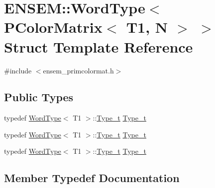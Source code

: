 \hypertarget{structENSEM_1_1WordType_3_01PColorMatrix_3_01T1_00_01N_01_4_01_4}{}\section{E\+N\+S\+EM\+:\+:Word\+Type$<$ P\+Color\+Matrix$<$ T1, N $>$ $>$ Struct Template Reference}
\label{structENSEM_1_1WordType_3_01PColorMatrix_3_01T1_00_01N_01_4_01_4}


{\ttfamily \#include $<$ensem\+\_\+primcolormat.\+h$>$}

\subsection*{Public Types}
\begin{DoxyCompactItemize}
\item 
typedef \mbox{\hyperlink{structENSEM_1_1WordType}{Word\+Type}}$<$ T1 $>$\+::\mbox{\hyperlink{structENSEM_1_1WordType_3_01PColorMatrix_3_01T1_00_01N_01_4_01_4_a32aa3b6b38804a81d375ed7a84abe6c7}{Type\+\_\+t}} \mbox{\hyperlink{structENSEM_1_1WordType_3_01PColorMatrix_3_01T1_00_01N_01_4_01_4_a32aa3b6b38804a81d375ed7a84abe6c7}{Type\+\_\+t}}
\item 
typedef \mbox{\hyperlink{structENSEM_1_1WordType}{Word\+Type}}$<$ T1 $>$\+::\mbox{\hyperlink{structENSEM_1_1WordType_3_01PColorMatrix_3_01T1_00_01N_01_4_01_4_a32aa3b6b38804a81d375ed7a84abe6c7}{Type\+\_\+t}} \mbox{\hyperlink{structENSEM_1_1WordType_3_01PColorMatrix_3_01T1_00_01N_01_4_01_4_a32aa3b6b38804a81d375ed7a84abe6c7}{Type\+\_\+t}}
\item 
typedef \mbox{\hyperlink{structENSEM_1_1WordType}{Word\+Type}}$<$ T1 $>$\+::\mbox{\hyperlink{structENSEM_1_1WordType_3_01PColorMatrix_3_01T1_00_01N_01_4_01_4_a32aa3b6b38804a81d375ed7a84abe6c7}{Type\+\_\+t}} \mbox{\hyperlink{structENSEM_1_1WordType_3_01PColorMatrix_3_01T1_00_01N_01_4_01_4_a32aa3b6b38804a81d375ed7a84abe6c7}{Type\+\_\+t}}
\end{DoxyCompactItemize}


\subsection{Member Typedef Documentation}
\mbox{\label{structENSEM_1_1WordType_3_01PColorMatrix_3_01T1_00_01N_01_4_01_4_a32aa3b6b38804a81d375ed7a84abe6c7}} 

